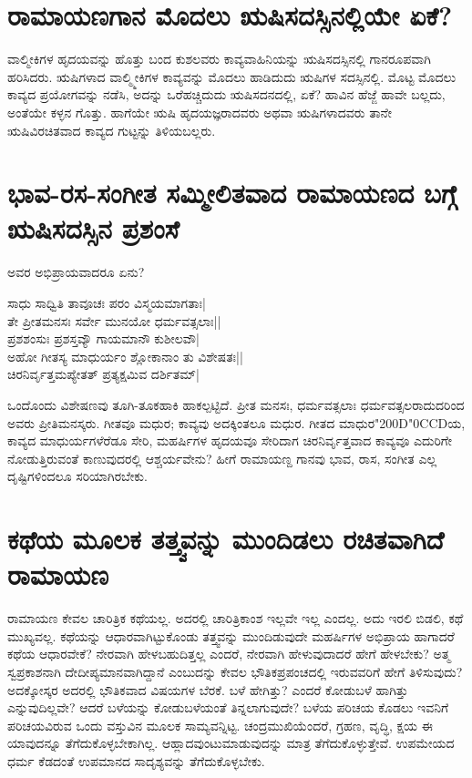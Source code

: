 \section*{ರಾಮಾಯಣಗಾನ ಮೊದಲು ಋಷಿಸದಸ್ಸಿನಲ್ಲಿಯೇ ಏಕೆ?}

ವಾಲ್ಮೀಕಿಗಳ ಹೃದಯವನ್ನು ಹೊತ್ತು ಬಂದ ಕುಶಲವರು ಕಾವ್ಯವಾಹಿನಿಯನ್ನು ಋಷಿಸದಸ್ಸಿನಲ್ಲಿ ಗಾನರೂಪವಾಗಿ ಹರಿಸಿದರು. ಋಷಿಗಳಾದ ವಾಲ್ಮ್ಮೀಕಿಗಳ ಕಾವ್ಯವನ್ನು ಮೊದಲು ಹಾಡಿದುದು ಋಷಿಗಳ ಸದಸ್ಸಿನಲ್ಲಿ. ಮೊಟ್ಟ ಮೊದಲು ಕಾವ್ಯದ ಪ್ರಯೋಗವನ್ನು ನಡೆಸಿ, ಅದನ್ನು ಒರೆಹಚ್ಚಿದುದು ಋಷಿಸದನದಲ್ಲಿ, ಏಕೆ? ಹಾವಿನ ಹೆಜ್ಜೆ ಹಾವೇ ಬಲ್ಲದು, ಅಂತೆಯೇ ಕಳ್ಳನ ಗೊತ್ತು. ಹಾಗೆಯೇ  ಋಷಿ ಹೃದಯಜ್ಞರಾದವರು ಅಥವಾ ಋಷಿಗಳಾದವರು ತಾನೇ ಋಷಿವಿರಚಿತವಾದ ಕಾವ್ಯದ ಗುಟ್ಟನ್ನು ತಿಳಿಯಬಲ್ಲರು. 

\section*{ಭಾವ-ರಸ-ಸಂಗೀತ ಸಮ್ಮೀಲಿತವಾದ ರಾಮಾಯಣದ ಬಗ್ಗೆ ಋಷಿಸದಸ್ಸಿನ ಪ್ರಶಂಸೆ}

ಅವರ ಅಭಿಪ್ರಾಯವಾದರೂ ಏನು?

\begin{shloka}
ಸಾಧು ಸಾಧ್ವಿತಿ ತಾವೂಚಃ ಪರಂ ವಿಸ್ಮಯಮಾಗತಾಃ|\\
ತೇ ಪ್ರೀತಮನಸಃ ಸರ್ವೇ ಮುನಯೋ ಧರ್ಮವತ್ಸಲಾಃ||\\
ಪ್ರಶಶಂಸುಃ ಪ್ರಶಸ್ತವ್ಯೌ ಗಾಯಮಾನೌ ಕುಶೀಲವೌ|\\
ಅಹೋ ಗೀತಸ್ಯ ಮಾಧುರ್ಯಂ ಶ್ಲೋಕಾನಾಂ ತು ವಿಶೇಷತಃ||\\
ಚಿರನಿರ್ವೃತ್ತಮಪ್ಯೇತತ್ ಪ್ರತ್ಯಕ್ಷಮಿವ ದರ್ಶಿತಮ್|\label{243}\\
\end{shloka}

ಒಂದೊಂದು ವಿಶೇಷಣವು ತೂಗಿ-ತೂಕಹಾಕಿ ಹಾಕಲ್ಪಟ್ಟಿದೆ. ಪ್ರೀತ ಮನಸಃ, ಧರ್ಮವತ್ಸಲಾಃ ಧರ್ಮವತ್ಸಲರಾದುದರಿಂದ ಅವರು ಪ್ರೀತಿಮನಸ್ಕರು. ಗೀತವೂ ಮಧುರ; ಕಾವ್ಯವು ಅದಕ್ಕಿಂತಲೂ ಮಧುರ. ಗೀತದ ಮಾಧುರ\char"200D\char"0CCDಯ,  ಕಾವ್ಯದ ಮಾಧುರ್ಯಗಳೆರೆಡೂ ಸೇರಿ, ಮಹರ್ಷಿಗಳ ಹೃದಯವೂ ಸೇರಿದಾಗ ಚಿರನಿರ್ವೃತ್ತವಾದ ಕಾವ್ಯವೂ ಎದುರಿಗೇ ನೋಡುತ್ತಿರುವಂತೆ ಕಾಣುವುದರಲ್ಲಿ ಆಶ್ಚರ್ಯವೇನು? ಹೀಗೆ ರಾಮಾಯಣ್ದ ಗಾನವು ಭಾವ, ರಾಸ, ಸಂಗೀತ ಎಲ್ಲ ದೃಷ್ಟಿಗಳಿಂದಲೂ ಸರಿಯಾಗಿರಬೇಕು. 

\section*{ಕಥೆಯ ಮೂಲಕ ತತ್ತ್ವವನ್ನು ಮುಂದಿಡಲು ರಚಿತವಾಗಿದೆ ರಾಮಾಯಣ}

ರಾಮಾಯಣ ಕೇವಲ ಚಾರಿತ್ರಿಕ ಕಥೆಯಲ್ಲ. ಅದರಲ್ಲಿ ಚಾರಿತ್ರಿಕಾಂಶ ಇಲ್ಲವೇ ಇಲ್ಲ ಎಂದಲ್ಲ. ಅದು ಇರಲಿ ಬಿಡಲಿ, ಕಥೆ ಮುಖ್ಯವಲ್ಲ. ಕಥೆಯನ್ನು ಆಧಾರವಾಗಿಟ್ಟುಕೊಂಡು ತತ್ತ್ವವನ್ನು ಮುಂದಿಡುವುದೇ ಮಹರ್ಷಿಗಳ ಅಭಿಪ್ರಾಯ ಹಾಗಾದರೆ ಕಥೆಯ ಆಧಾರವೇಕೆ? ನೇರವಾಗಿ ಹೇಳಬಹುದಿತ್ತಲ್ಲ ಎಂದರೆ, ನೇರವಾಗಿ ಹೇಳುವುದಾದರೆ ಹೇಗೆ ಹೇಳಬೇಕು? ಅತ್ಮ ಸ್ವಪ್ರಕಾಶನಾಗಿ ದೇದೀಪ್ಯಮಾನವಾಗಿದ್ದಾನೆ ಎಂಬುದನ್ನು ಕೇವಲ ಭೌತಿಕಪ್ರಪಂಚದಲ್ಲಿ ಇರುವವರಿಗೆ ಹೇಗೆ ತಿಳಿಸುವುದು? ಅದಕ್ಕೋಸ್ಕರ ಅದರಲ್ಲಿ ಭೌತಿಕವಾದ ವಿಷಯಗಳ ಬೆರಕೆ. ಬಳೆ ಹೇಗಿತ್ತು? ಎಂದರೆ ಕೋಡುಬಳೆ ಹಾಗಿತ್ತು ಎನ್ನುವುದಿಲ್ಲವೇ? ಆದರೆ ಬಳೆಯನ್ನು ಕೋಡುಬಳೆಯಂತೆ ತಿನ್ನಲಾಗುವುದೇ? ಬಳೆಯ ಪರಿಚಯ ಕೊಡಲು ಇವನಿಗೆ ಪರಿಚಯವಿರುವ ಒಂದು ವಸ್ತುವಿನ ಮೂಲಕ ಸಾಮ್ಯವನ್ನಿಟ್ಟ. ಚಂದ್ರಮುಖಿಯೆಂದರೆ, ಗ್ರಹಣ, ವೃದ್ಧಿ, ಕ್ಷಯ ಈ ಯಾವುದನ್ನೂ ತೆಗೆದುಕೊಳ್ಳಬೇಕಾಗಿಲ್ಲ. ಆಹ್ಲಾದವುಂಟುಮಾಡುವುದನ್ನು ಮಾತ್ರ ತೆಗೆದುಕೊಳ್ಳುತ್ತೇವೆ. ಉಪಮೇಯದ ಧರ್ಮ ಕೆಡದಂತೆ ಉಪಮಾನದ ಸಾದೃಶ್ಯವನ್ನು ತೆಗೆದುಕೊಳ್ಳಬೇಕು. 

